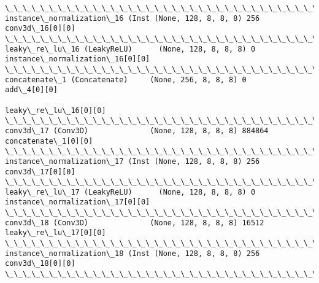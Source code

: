 \documentclass[11pt]{article}
\begin{document}
\begin{Verbatim}[commandchars=\\\{\}]
\_\_\_\_\_\_\_\_\_\_\_\_\_\_\_\_\_\_\_\_\_\_\_\_\_\_\_\_\_\_\_\_\_\_\_\_\_\_\_\_\_\_\_\_\_\_\_\_\_\_\_\_\_\_\_\_\_\_\_\_\_\_\_\_\_\_\_\_\_\_\_\_\_\_\_\_\_\_\_\_\_\_\_\_\_\_\_\_\_\_\_\_\_\_\_\_\_\_
instance\_normalization\_16 (Inst (None, 128, 8, 8, 8) 256         conv3d\_16[0][0]                  
\_\_\_\_\_\_\_\_\_\_\_\_\_\_\_\_\_\_\_\_\_\_\_\_\_\_\_\_\_\_\_\_\_\_\_\_\_\_\_\_\_\_\_\_\_\_\_\_\_\_\_\_\_\_\_\_\_\_\_\_\_\_\_\_\_\_\_\_\_\_\_\_\_\_\_\_\_\_\_\_\_\_\_\_\_\_\_\_\_\_\_\_\_\_\_\_\_\_
leaky\_re\_lu\_16 (LeakyReLU)      (None, 128, 8, 8, 8) 0           instance\_normalization\_16[0][0]  
\_\_\_\_\_\_\_\_\_\_\_\_\_\_\_\_\_\_\_\_\_\_\_\_\_\_\_\_\_\_\_\_\_\_\_\_\_\_\_\_\_\_\_\_\_\_\_\_\_\_\_\_\_\_\_\_\_\_\_\_\_\_\_\_\_\_\_\_\_\_\_\_\_\_\_\_\_\_\_\_\_\_\_\_\_\_\_\_\_\_\_\_\_\_\_\_\_\_
concatenate\_1 (Concatenate)     (None, 256, 8, 8, 8) 0           add\_4[0][0]                      
                                                                 leaky\_re\_lu\_16[0][0]             
\_\_\_\_\_\_\_\_\_\_\_\_\_\_\_\_\_\_\_\_\_\_\_\_\_\_\_\_\_\_\_\_\_\_\_\_\_\_\_\_\_\_\_\_\_\_\_\_\_\_\_\_\_\_\_\_\_\_\_\_\_\_\_\_\_\_\_\_\_\_\_\_\_\_\_\_\_\_\_\_\_\_\_\_\_\_\_\_\_\_\_\_\_\_\_\_\_\_
conv3d\_17 (Conv3D)              (None, 128, 8, 8, 8) 884864      concatenate\_1[0][0]              
\_\_\_\_\_\_\_\_\_\_\_\_\_\_\_\_\_\_\_\_\_\_\_\_\_\_\_\_\_\_\_\_\_\_\_\_\_\_\_\_\_\_\_\_\_\_\_\_\_\_\_\_\_\_\_\_\_\_\_\_\_\_\_\_\_\_\_\_\_\_\_\_\_\_\_\_\_\_\_\_\_\_\_\_\_\_\_\_\_\_\_\_\_\_\_\_\_\_
instance\_normalization\_17 (Inst (None, 128, 8, 8, 8) 256         conv3d\_17[0][0]                  
\_\_\_\_\_\_\_\_\_\_\_\_\_\_\_\_\_\_\_\_\_\_\_\_\_\_\_\_\_\_\_\_\_\_\_\_\_\_\_\_\_\_\_\_\_\_\_\_\_\_\_\_\_\_\_\_\_\_\_\_\_\_\_\_\_\_\_\_\_\_\_\_\_\_\_\_\_\_\_\_\_\_\_\_\_\_\_\_\_\_\_\_\_\_\_\_\_\_
leaky\_re\_lu\_17 (LeakyReLU)      (None, 128, 8, 8, 8) 0           instance\_normalization\_17[0][0]  
\_\_\_\_\_\_\_\_\_\_\_\_\_\_\_\_\_\_\_\_\_\_\_\_\_\_\_\_\_\_\_\_\_\_\_\_\_\_\_\_\_\_\_\_\_\_\_\_\_\_\_\_\_\_\_\_\_\_\_\_\_\_\_\_\_\_\_\_\_\_\_\_\_\_\_\_\_\_\_\_\_\_\_\_\_\_\_\_\_\_\_\_\_\_\_\_\_\_
conv3d\_18 (Conv3D)              (None, 128, 8, 8, 8) 16512       leaky\_re\_lu\_17[0][0]             
\_\_\_\_\_\_\_\_\_\_\_\_\_\_\_\_\_\_\_\_\_\_\_\_\_\_\_\_\_\_\_\_\_\_\_\_\_\_\_\_\_\_\_\_\_\_\_\_\_\_\_\_\_\_\_\_\_\_\_\_\_\_\_\_\_\_\_\_\_\_\_\_\_\_\_\_\_\_\_\_\_\_\_\_\_\_\_\_\_\_\_\_\_\_\_\_\_\_
instance\_normalization\_18 (Inst (None, 128, 8, 8, 8) 256         conv3d\_18[0][0]                  
\_\_\_\_\_\_\_\_\_\_\_\_\_\_\_\_\_\_\_\_\_\_\_\_\_\_\_\_\_\_\_\_\_\_\_\_\_\_\_\_\_\_\_\_\_\_\_\_\_\_\_\_\_\_\_\_\_\_\_\_\_\_\_\_\_\_\_\_\_\_\_\_\_\_\_\_\_\_\_\_\_\_\_\_\_\_\_\_\_\_\_\_\_\_\_\_\_\_

\end{Verbatim}
\end{document}
